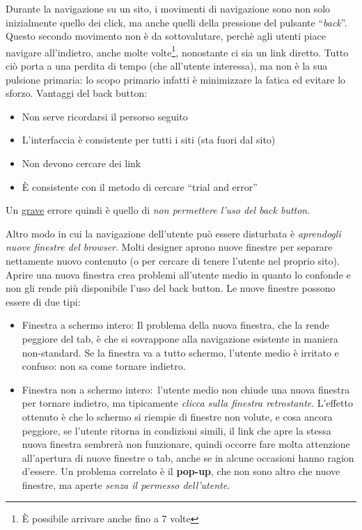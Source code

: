 Durante la navigazione su un sito, i movimenti di navigazione sono non solo inizialmente quello dei click, ma anche quelli della pressione del pulsante ``\textit{back}''. Questo secondo movimento non \`e da sottovalutare, perch\`e agli utenti piace navigare all'indietro, anche molte volte\footnote{\`E possibile arrivare anche fino a 7 volte}, nonostante ci sia un link diretto. Tutto ci\`o porta a una perdita di tempo (che all'utente interessa), ma non \`e la sua pulsione primaria: lo scopo primario infatti \`e minimizzare la fatica ed evitare lo sforzo. Vantaggi del back button:
\begin{itemize}

\item Non serve ricordarsi il persorso seguito

\item L'interfaccia \`e consistente per tutti i siti (sta fuori dal sito)

\item Non devono cercare dei link

\item \`E consistente con il metodo di cercare ``trial and error''

\end{itemize}

Un \underline{grave} errore quindi \`e quello di \textit{non permettere l'uso del back button}.

Altro modo in cui la navigazione dell'utente pu\`o essere disturbata \`e \textit{aprendogli nuove finestre del browser}. Molti designer aprono nuove finestre per separare nettamente nuovo contenuto (o per cercare di tenere l'utente nel proprio sito). Aprire una nuova finestra crea problemi all'utente medio in quanto lo confonde e non gli rende pi\`u disponibile l'uso del back button. Le nuove finestre possono essere di due tipi:
\begin{itemize}

\item Finestra a schermo intero: Il problema della nuova finestra, che la rende peggiore del tab, \`e che si sovrappone alla navigazione esistente in maniera non-standard. Se la finestra va a tutto schermo, l'utente medio \`e irritato e confuso: non sa come tornare indietro.

\item Finestra non a schermo intero:\ l'utente medio non chiude una nuova finestra per tornare indietro, ma tipicamente \textit{clicca sulla finestra retrostante}. L'effetto ottenuto \`e che lo schermo si riempie di finestre non volute, e cosa ancora peggiore, se l'utente ritorna in condizioni simili, il link che apre la stessa nuova finestra sembrer\`a non funzionare, quindi occorre fare molta attenzione all'apertura di nuove finestre o tab, anche se in alcune occasioni hanno ragion d'essere. Un problema correlato \`e il \textbf{pop-up}, che non sono altro che nuove finestre, ma aperte \textit{senza il permesso dell'utente}.

\end{itemize}

